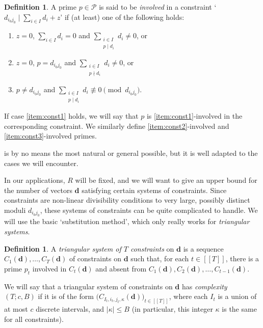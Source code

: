 \documentclass[11pt]{amsart}
\theoremstyle{definition}
\newtheorem{definition}[theorem]{Definition}
\renewcommand{\leq}{\leqslant}
\newcommand{\sinterval}[1]{[\![#1]\!] }
\newcommand{\abs}[1]{\left|#1\right|}
\newcommand{\primes}{\mathcal{P}}
\renewcommand{\d}{\boldsymbol{d}}
\newcommand{\pcomp}[2]{d_{#1#2}}
\newcommand{\ncond}{T}
\newcommand{\cshift}{\kappa}
\begin{document}
\begin{definition}
\label{def:involved}
A prime $p\in \primes$ is said to be \emph{involved} in a constraint `$\pcomp{i_0}{j_0} \mid \sum_{i\in I} d_i + z$' if (at least) one of the following holds:
\begin{enumerate}[label=(\roman*), ref=\roman*]
	\item \label{item:const1} $z=0$, $\displaystyle{\sum_{i\in I} d_i = 0}$ and $\displaystyle{\sum_{\substack{i\in I\\ p \mid d_i}} d_i \neq 0}$, or
	\item \label{item:const2} $z=0$, $p = \pcomp{i_0}{j_0}$ and $\displaystyle{\sum_{\substack{i\in I\\ p \nmid d_i}} d_i \neq 0}$, or
	\item \label{item:const3} $p \neq \pcomp{i_0}{j_0}$ and $\displaystyle{\sum_{\substack{i\in I\\ p \mid d_i}} d_i \not\equiv 0 \pmod{\pcomp{i_0}{j_0}}}$.
\end{enumerate}
If case \cref{item:const1} holds, we will say that $p$ is \cref{item:const1}-involved in the corresponding constraint. We similarly define \cref{item:const2}-involved and \cref{item:const3}-involved primes.
\end{definition}

 is by no means the most natural or general possible, but it is well adapted to the cases we will encounter.

In our applications, $R$ will be fixed, and we will want to give an upper bound for the number of vectors $\d$ satisfying certain systems of constraints. Since constraints are non-linear divisibility conditions to very large, possibly distinct moduli $\pcomp{i_0}{j_0}$, these systems of constraints can be quite complicated to handle. We will use the basic `substitution method', which only really works for \emph{triangular systems}. 

\begin{definition}
\label{def:system}
A \emph{triangular system of $\ncond$ constraints} on $\d$ is a sequence $C_1(\d), \ldots, C_{\ncond}(\d)$ of constraints on $\d$ such that, for each $t\in \sinterval{{\ncond}}$, there is a prime $p_t$ involved in $C_t(\d)$ and absent from $C_1(\d), C_2(\d), \ldots, C_{t-1}(\d)$.

We will say that a triangular system of constraints on $\d$ has \emph{complexity $(T; c, B)$} if it is of the form $\big(C_{I_t, i_t, j_t, \cshift}(\d)\big)_{t\in \sinterval{\ncond}}$, where each $I_t$ is a union of at most $c$ discrete intervals, and $\abs{\cshift}\leq B$ (in particular, this integer $\cshift$ is the same for all constraints).
\end{definition}
\end{document}
